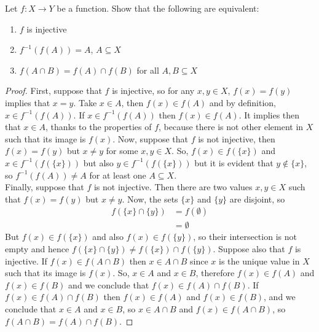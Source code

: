 \documentclass{tufte-handout}
\begin{document}
\begin{problem}
	Let $f: X \to Y$ be a function. Show that the following are equivalent:
	\begin{enumerate}
		\item $f$ is injective
		\item $f^{-1}(f(A)) = A$, $A \subseteq X$
		\item $f(A \cap B) = f(A) \cap f(B)$ for all $A, B \subseteq X$
	\end{enumerate}
\end{problem}
\begin{proof}
	First, suppose that $f$ is injective, so for any $x, y \in X$, $f(x) = f(y)$ implies that $x = y$. Take $x \in A$, then $f(x) \in f(A)$ and by definition, $x \in f^{-1}(f(A))$. If $x \in f^{-1}(f(A))$ then $f(x) \in f(A)$. It implies then that $x \in A$, thanks to the properties of $f$, because there is not other element in $X$ such that its image is $f(x)$. Now, suppose that $f$ is not injective, then $f(x) = f(y)$ but $x \neq y$ for some $x, y \in X$. So, $f(x) \in f(\{x\})$ and $x \in f^{-1}(f(\{x\}))$ but also $y \in f^{-1}(f(\{x\}))$ but it is evident that $y \not\in \{x\}$, so $f^{-1}(f(A)) \neq A$ for at least one $A \subseteq X$.\\

	Finally, suppose that $f$ is not injective. Then there are two values $x, y \in X$ such that $f(x) = f(y)$ but $x \neq y$. Now, the sets $\{x\}$ and $\{y\}$ are disjoint, so
	\begin{align*}
		f(\{x\} \cap \{y\}) &= f(\emptyset)\\
		&= \emptyset
	\end{align*}
	But $f(x) \in f(\{x\})$ and also $f(x) \in f(\{y\})$, so their intersection is not empty and hence $f(\{x\} \cap \{y\}) \neq f(\{x\}) \cap f(\{y\})$. Suppose also that $f$ is injective. If $f(x) \in f(A \cap B)$ then $x \in A \cap B$ since $x$ is the unique value in $X$ such that its image is $f(x)$. So, $x \in A$ and $x \in B$, therefore $f(x) \in f(A)$ and $f(x) \in f(B)$ and we conclude that $f(x) \in f(A) \cap f(B)$. If $f(x) \in f(A) \cap f(B)$ then $f(x) \in f(A)$ and $f(x) \in f(B)$, and we conclude that $x \in A$ and $x \in B$, so $x \in A \cap B$ and $f(x) \in f(A \cap B)$, so $f(A \cap B) = f(A) \cap f(B)$.
\end{proof}
\end{document}
